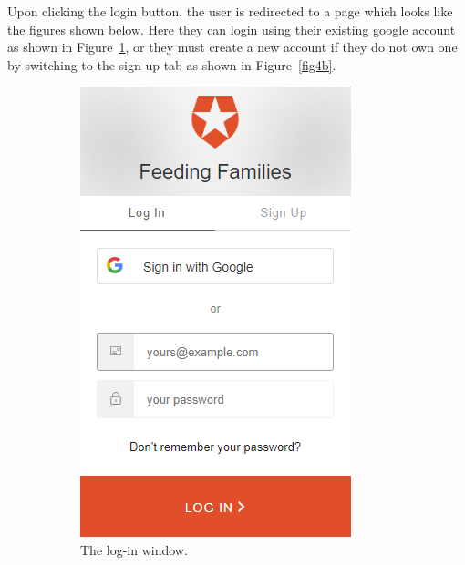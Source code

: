 \documentclass[12pt]{article}
\begin{document}
Upon clicking the login button, the user is redirected to a page which looks like the figures shown below. Here they can login using their existing google account as shown in Figure~\ref{fig4a}, or they must create a new account if they do not own one by switching to the sign up tab as shown in Figure~\ref{fig4b}.

\begin{figure}[h]
 
    \begin{subfigure}{0.515\textwidth}
    \includegraphics[width=0.9\linewidth]{main/loginredirect1.png} 
    \caption{The log-in window.}
    \label{fig4a}
    \end{subfigure}
    \begin{subfigure}{0.5\textwidth}

\end{subfigure}
\end{figure}
\end{document}
